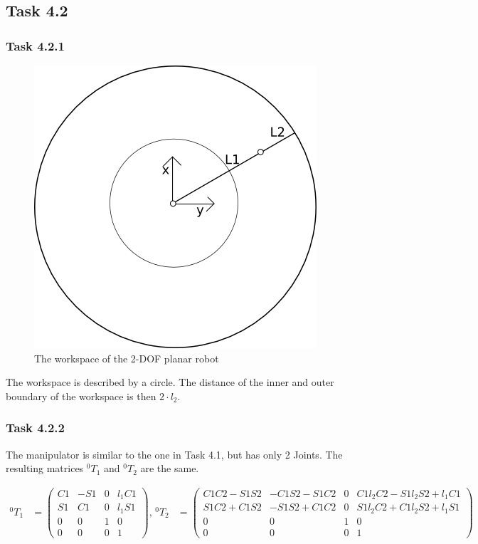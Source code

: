 \subsection*{Task 4.2}

\subsubsection*{Task 4.2.1}
\begin{figure}[h]
	\includegraphics[scale=0.7]{4_2_1.png}
	\caption{The workspace of the 2-DOF planar robot}
	\label{fig:2dof-planar}
\end{figure}
The workspace is described by a circle. The distance of the inner and outer boundary of the workspace is then $2 \cdot l_2$.

\subsubsection*{Task 4.2.2}
The manipulator is similar to the one in Task 4.1, but has only 2 Joints. The resulting matrices $^0T_1$ and $^0T_2$ are the same.

\begin{align*}
^0T_1 &= 
\begin{pmatrix}
C1 & -S1 & 0 & l_1 C1\\
S1 &  C1 & 0 & l_1 S1\\
0  &  0  & 1 & 0\\
0  &  0  & 0 & 1
\end{pmatrix},
\,^0T_2 &= 
\begin{pmatrix}
C1C2-S1S2 & -C1S2-S1C2 & 0 & C1l_2C2-S1l_2S2+l_1C1\\
S1C2+C1S2 & -S1S2+C1C2 & 0 & S1l_2C2+C1l_2S2+l_1S1\\
0  &  0  & 1 & 0\\
0  &  0  & 0 & 1
\end{pmatrix}
\end{align*}

